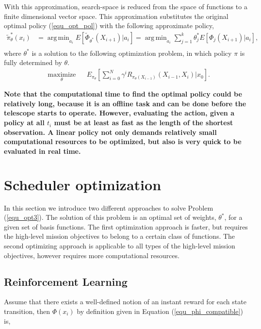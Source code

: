 \documentclass[12pt]{aastex62}
\theoremstyle{definition}
\DeclareMathOperator*{\argmin}{arg\,min}
\begin{document}
With this approximation, search-space is reduced from the space of functions to a finite dimensional vector space. This approximation substitutes the original optimal policy (\ref{equ_opt_pol}) with the following approximate policy,
%
\begin{equation}\label{equ_approx_pol}
\begin{aligned}
\tilde{\pi}_{\theta}^*(x_{i})& = \argmin_{a_{i}} E[ \tilde{\Phi}_{\theta^*}(X_{i+1}) | a_{i}] =  \argmin_{a_{i}} \sum_{j=1}^k \theta^*_j E[\Phi_j(X_{i+1}) | a_{i}],\\
\end{aligned}
\end{equation}
%
where $\theta^*$ is a solution to the following optimization problem, in which policy $\pi$ is fully determined by $\theta$.
%
\begin{equation}\label{equ_opt3}
\begin{aligned}
& \underset{\theta}{\text{maximize}}
& & E_{\pi_{\theta}}[\sum_{i=0}^N \gamma^i R_{\pi_{\theta} (X_{i-1})}(X_{{i-1}}, X_{i}) | x_0].
\end{aligned}
\end{equation}

{\bf Note that the computational time to find the optimal policy could be relatively long, because it is an offline task and can be done before the telescope starts to operate. However, evaluating the action, given a policy at all $t_i$ must be at least as fast as the length of the shortest observation. A linear policy not only demands relatively small computational resources to be optimized, but also is very quick to be evaluated in real time.\bf}

\section{Scheduler optimization}\label{sec_opt}
In this section we introduce two different approaches to solve Problem (\ref{equ_opt3}). The solution of this problem is an optimal set of weights, $\theta^*$, for a given set of basis functions. The first optimization approach is faster, but requires the high-level mission objectives to belong to a certain class of functions. The second optimizing approach is applicable to all types of the high-level mission objectives, however requires more computational resources. 

\subsection{Reinforcement Learning}
Assume that there exists a well-defined notion of an instant reward for each state transition, then $\Phi(x_{{i}})$ by definition given in Equation (\ref{equ_phi_compatible}) is,
\end{document}
